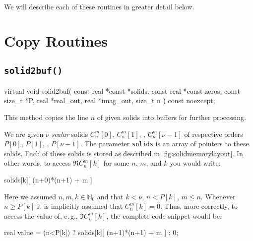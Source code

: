 \documentclass{scrbook}
\newcommand{\naturals}{\ensuremath{\mathbb{N}}}
\begin{document}
We will describe each of these routines in greater detail below.

\section{Copy Routines}

\subsection{\texorpdfstring{\lstinline|solid2buf()|}{solid2buf}}
\begin{cppcode*}
virtual void solid2buf( const real *const *solids,
                        const real *const  zeros, const size_t *P,
                        real *real_out, real *imag_out, size_t n ) const noexcept;
\end{cppcode*}
This method copies the line $n$ of given solids into buffers for further
processing.

We are given $\nu$ \emph{scalar} solids $C_n^m[0]$, $C_n^m[1]$, \textellipsis,
$C_n^m[\nu-1]$ of respective orders $P[0]$, $P[1]$, \textellipsis, $P[\nu-1]$.
The parameter \lstinline|solids| is an array of pointers to these solids. Each
of these solids is stored as described in \cref{fig:solidmemorylayout}. In other
words, to access $\Re C_n^m[k]$ for some $n$, $m$, and $k$ you would write:
\begin{cppcode*}
solids[k][ (n+0)*(n+1) + m ]
\end{cppcode*}
Here we assumed $n,m,k\in\naturals_0$ and that $k<\nu$, $n < P[k]$,
$m\leq n$. Whenever $n\geq P[k]$ it is implicitly assumed that $C_n^m[k]=0$.
Thus, more correctly, to access the value of, e.\,g., $\Im C_n^m[k]$, the
complete code snippet would be:
\begin{cppcode*}
real value = (n<P[k]) ? solids[k][ (n+1)*(n+1) + m ] : 0;
\end{cppcode*}
\end{document}
